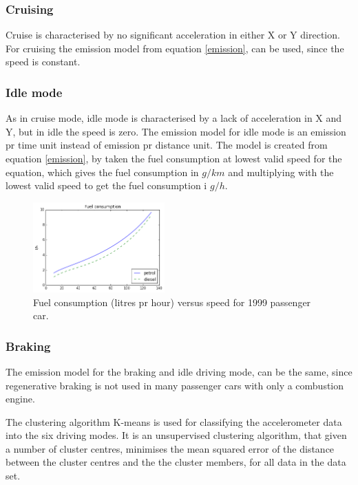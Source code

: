 \documentclass[conference]{IEEEtran}
\begin{document}
\subsubsection{Cruising}
Cruise is characterised by no significant acceleration in either X or Y direction. For cruising the emission model from equation \ref{emission}, can be used, since the speed is constant.

\subsubsection{Idle mode}
As in cruise mode, idle mode is characterised by a lack of acceleration in X and Y, but in idle the speed is zero. The emission model for idle mode is an emission pr time unit instead of emission pr distance unit. The model is created from equation \ref{emission}, by taken the fuel consumption at lowest valid speed for the equation, which gives the fuel consumption in $g/km$ and multiplying with the lowest valid speed to get the fuel consumption i $g/h$.
\begin{figure}[h]
	\centering
  \includegraphics[width=0.45\textwidth]{fc_liter_pr_hour}
  \caption{Fuel consumption  (litres pr hour) versus speed for 1999 passenger car.}
  \label{FC}
\end{figure}

\subsubsection{Braking}
The emission model for the braking and idle driving mode, can be the same, since regenerative braking is not used in many passenger cars with only a combustion engine.


The clustering algorithm K-means is used for classifying the accelerometer data into the six driving modes. It is an unsupervised clustering algorithm, that given a number of cluster centres, minimises the mean squared error of the distance between the cluster centres and the the cluster members, for all data in the data set. 
\end{document}
